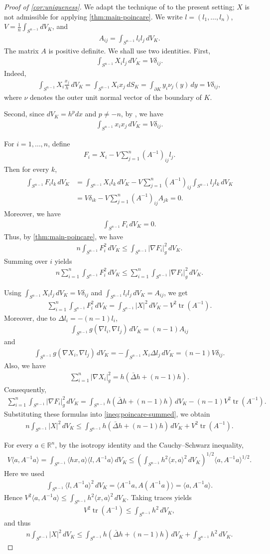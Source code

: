 \documentclass[12pt]{amsart}
\newcommand{\R}{\mathbb{R}}
\newcommand{\Sn}{S^{n-1}}
\newcommand{\ip}[2]{\langle #1,#2\rangle}
\newcommand{\abs}[1]{\left|#1\right|}
\newcommand{\eq}[1]{\begin{equation}\begin{alignedat}{2}#1\end{alignedat}\end{equation}}
\theoremstyle{plain}
\theoremstyle{definition}
\theoremstyle{remark}
\numberwithin{equation}{section}
\begin{document}
\begin{proof}[Proof of \autoref{cor:uniqueness}]
We adapt the technique of \cite{IM23} to the present setting; $X$ is not admissible for applying \autoref{thm:main-poincare}. We write $l=(l_1,\ldots,l_n)$, $V=\frac{1}{n}\int_{\Sn}dV_K$, and
\eq{
A_{ij}=\int_{\Sn}l_i l_j\,dV_K.
}
The matrix $A$ is positive definite. We shall use two identities. First,
\eq{
\int_{\Sn}X_i l_j\,dV_K=V\delta_{ij}.
}
Indeed,
\eq{
\int_{\Sn}X_i\frac{x_j}{h}\,dV_K=\int_{\Sn}X_i x_j\,dS_K=\int_{\partial K}y_i\nu_j(y)\,dy=V\delta_{ij},
}
where $\nu$ denotes the outer unit normal vector of the boundary of $K$.

Second, since $dV_K=h^pdx$ and $p\neq -n$, by \cite[Lem. 4.2]{HI25}, we have
\eq{
\int_{\Sn}x_i x_j\,dV_K=V\delta_{ij}.
}

For $i=1,\ldots,n$, define
\eq{
F_i=X_i-V\sum_{j=1}^n(A^{-1})_{ij}l_j.
}
Then for every $k$,
\eq{
\begin{aligned}
\int_{\Sn}F_il_k\,dV_K
&=\int_{\Sn}X_il_k\,dV_K-V\sum_{j=1}^n(A^{-1})_{ij}\int_{\Sn}l_jl_k\,dV_K\\
&=V\delta_{ik}-V\sum_{j=1}^n(A^{-1})_{ij}A_{jk}=0.
\end{aligned}
}
Moreover, we have
\eq{
\int_{\Sn}F_i\,dV_K=0.
}
Thus, by \autoref{thm:main-poincare}, we have
\eq{\label{ineq:poincare-each-i}
n\int_{\Sn}F_i^2\,dV_K\le \int_{\Sn}\abs{\nabla F_i}_g^2\,dV_K.
}
Summing over $i$ yields
\eq{\label{ineq:poincare-summed}
n\sum_{i=1}^n\int_{\Sn}F_i^2\,dV_K\le 
\sum_{i=1}^n\int_{\Sn}\abs{\nabla F_i}_g^2\,dV_K.
}

Using $\int_{\Sn}X_i l_j\,dV_K=V\delta_{ij}$ and $\int_{\Sn}l_i l_j\,dV_K=A_{ij}$, we get
\eq{
\sum_{i=1}^n\int_{\Sn}F_i^2\,dV_K
=\int_{\Sn}\abs{X}^2\,dV_K-V^2\operatorname{tr}(A^{-1}).
}
Moreover, due to $\Delta l_i=-(n-1)l_i$,
\eq{
\int_{\Sn}g(\nabla l_i,\nabla l_j)\,dV_K=(n-1)A_{ij}
}
and
\eq{
\int_{\Sn}g(\nabla X_i,\nabla l_j)\,dV_K
=-\int_{\Sn}X_i\Delta l_j\,dV_K=(n-1)V\delta_{ij}.
}
Also, we have
\eq{
\sum_{i=1}^n\abs{\nabla X_i}_g^2=h\left(\bar{\Delta} h+(n-1)h\right).
}
Consequently,
\eq{
\sum_{i=1}^n\int_{\Sn}\abs{\nabla F_i}_g^2\,dV_K=\int_{\Sn}h\left(\bar{\Delta} h+(n-1)h\right)\,dV_K-(n-1)V^2\operatorname{tr}(A^{-1}).
}
Substituting these formulas into \eqref{ineq:poincare-summed}, we obtain
\eq{ \label{ineq:key-estimate-L2-norm-X}
n\int_{\Sn}\abs{X}^2\,dV_K\le \int_{\Sn}h\left(\bar{\Delta} h+(n-1)h\right)\,dV_K+V^2\operatorname{tr}(A^{-1}).
}

For every $a\in\R^n$, by the isotropy identity and the Cauchy--Schwarz inequality,
\eq{ 
V\ip{a}{A^{-1}a}
=\int_{\Sn}\ip{hx}{a}\ip{l}{A^{-1}a}\,dV_K
\le
\left(\int_{\Sn}h^2\ip{x}{a}^2\,dV_K\right)^{1/2}\ip{a}{A^{-1}a}^{1/2}.
}
Here we used 
\eq{
\int_{\Sn}\ip{l}{A^{-1}a}^2\,dV_K
=\ip{A^{-1}a}{A(A^{-1}a)}
=\ip{a}{A^{-1}a}.
}
Hence $V^2\ip{a}{A^{-1}a}\le \int_{\Sn}h^2\ip{x}{a}^2\,dV_K$. Taking traces yields
\eq{
V^2\operatorname{tr}(A^{-1})\le \int_{\Sn}h^2\,dV_K,
}
and thus
\eq{ \label{ineq:poincare-for-|X|^2}
n\int_{\Sn}\abs{X}^2\,dV_K\le \int_{\Sn}h\left(\bar{\Delta} h+(n-1)h\right)\,dV_K+\int_{\Sn}h^2\,dV_K.
}


\end{proof}
\end{document}
